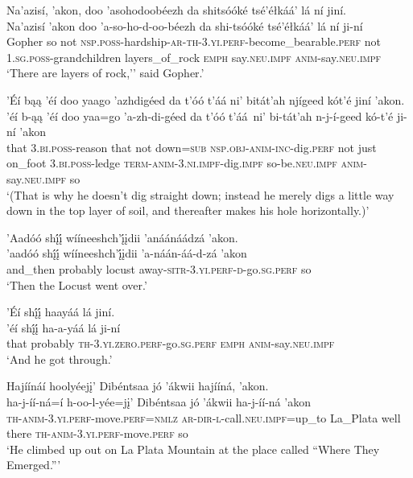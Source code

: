 \ea\label{ex:text4-3-21}
Na’azisí, ’akon, doo ’asohodoobéezh da shitsóóké tsé’éłkáá’ lá ní jiní.\\
\gll Na’azisí	’akon	doo	’a-so-ho-d-oo-béezh	da	shi-tsóóké	tsé’éłkáá’	lá	ní	ji-ní\\
     Gopher	so	not	\textsc{nsp}.\textsc{poss}-hardship-\textsc{ar}-\textsc{th}-3.\textsc{yi}.\textsc{perf}-become\_bearable.\textsc{perf}	not	1.\textsc{sg}.\textsc{poss}-grandchildren	layers\_of\_rock	\textsc{emph}	say.\textsc{neu}.\textsc{impf}	\textsc{anim}-say.\textsc{neu}.\textsc{impf}\\
\glt `There are layers of rock,'' said Gopher.'
\z

\ea\label{ex:text4-3-22}
’Éí bąą ’éí doo yaago ’azhdigéed da t’óó t’áá ni’ bitát’ah njígeed kót’é jiní ’akon.\\
\gll ’éí	b-ąą	’éí	doo	yaa=go	’a-zh-di-géed	da	t’óó	t’áá~{ni’}	bi-tát’ah	n-j-í-geed	kó-t’é	ji-ní	’akon\\
     that	3.\textsc{bi}.\textsc{poss}-reason	that	not	down=\textsc{sub}	\textsc{nsp}.\textsc{obj}-\textsc{anim}-\textsc{inc}-dig.\textsc{perf}	not	just	on\_foot	3.\textsc{bi}.\textsc{poss}-ledge	\textsc{term}-\textsc{anim}-3.\textsc{ni}.\textsc{impf}-dig.\textsc{impf}	so-be.\textsc{neu}.\textsc{impf}	\textsc{anim}-say.\textsc{neu}.\textsc{impf}	so\\
\glt `(That is why he doesn't dig straight down; instead he merely digs a little way down in the top layer of soil, and thereafter makes his hole horizontally.)'
\z

\newpage
\ea\label{ex:text4-3-23}
’Aadóó shį́į́ wííneeshch’į́įdii ’anáánáádzá ’akon.\\
\gll ’aadóó	shį́į́	wííneeshch’į́įdii	’a-náán-áá-d-zá	’akon\\
     and\_then	probably	locust	away-\textsc{sitr}-3.\textsc{yi}.\textsc{perf}-\textsc{d}-go.\textsc{sg}.\textsc{perf}	so\\
\glt `Then the Locust went over.'
\z

\ea\label{ex:text4-3-24}
’Éí shį́į́ haayáá lá jiní.\\
\gll ’éí	shį́į́	ha-a-yáá	lá	ji-ní\\
     that	probably	\textsc{th}-3.\textsc{yi}.\textsc{zero}.\textsc{perf}-go.\textsc{sg}.\textsc{perf}	\textsc{emph}	\textsc{anim}-say.\textsc{neu}.\textsc{impf}\\
\glt `And he got through.'
\z

\ea\label{ex:text4-4-1}
Hajíínáí hoolyéejį’ Dibéntsaa jó ’ákwii hajííná, ’akon.\\
\gll ha-j-íí-ná=í	h-oo-l-yée=jį’	Dibéntsaa	jó	’ákwii	ha-j-íí-ná	’akon\\
     \textsc{th}-\textsc{anim}-3.\textsc{yi}.\textsc{perf}-move.\textsc{perf}=\textsc{nmlz}	\textsc{ar}-\textsc{dir}-\textsc{l}-call.\textsc{neu}.\textsc{impf}=up\_to	La\_Plata	well	there	\textsc{th}-\textsc{anim}-3.\textsc{yi}.\textsc{perf}-move.\textsc{perf}	so\\
\glt `He climbed up out on La Plata Mountain at the place called ``Where They Emerged.'''
\z

